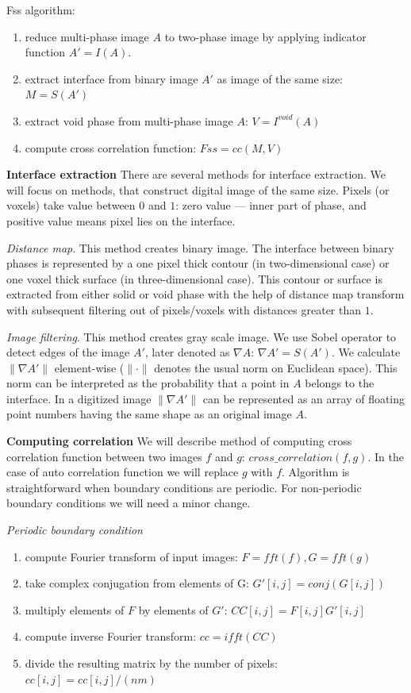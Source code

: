 \documentclass[reprint,amsmath,amssymb,aps,pre]{revtex4-1}
\begin{document}
Fss algorithm:
\begin{enumerate}
    \item reduce multi-phase image $A$ to two-phase image by applying indicator function $A'= I(A)$.
    \item extract interface from binary image $A'$ as image of the same size: $M = S(A')$
    \item extract void phase from multi-phase image $A$: $V = I^{void}(A)$
    \item compute cross correlation function: $Fss = cc(M, V)$
\end{enumerate}

\textbf{Interface extraction}
There are several methods for interface extraction.
We will focus on methods, that construct digital image of the same size.
Pixels (or voxels) take value between $0$ and $1$:
zero value --- inner part of phase, and positive value means pixel lies on the interface.

\textit{Distance map}.
This method creates binary image. 
The interface between binary phases is represented by a one
pixel thick contour (in two-dimensional case) or one voxel thick surface (in
three-dimensional case). This contour or surface is extracted from either solid
or void phase with the help of distance map transform with subsequent filtering
out of pixels/voxels with distances greater than $1$.

\textit{Image filtering}.
This method creates gray scale image.
We use Sobel operator
to detect edges of the image $A'$, later denoted as $\nabla A$:
$\nabla A' = S(A')$. We calculate $\|\nabla A'\|$ element-wise ($\|\cdot\|$
denotes the usual norm on Euclidean space). This norm can be interpreted as the
probability that a point in $A$ belongs to the interface. In a digitized image
$\|\nabla A'\|$ can be represented as an array of floating point numbers having
the same shape as an original image $A$.

\textbf{Computing correlation}
We will describe method of computing cross correlation function between two images $f$ and $g$: $cross\_correlation(f, g)$. In the case of auto correlation function we will replace $g$ with $f$. Algorithm is straightforward when boundary conditions are periodic.
For non-periodic boundary conditions we will need a minor change.

\textit{Periodic boundary condition}
\begin{enumerate}
    \item compute Fourier transform of input images: $F = fft(f), G = fft(g)$
    \item take complex conjugation from elements of G: $G'[i, j] = conj(G[i, j])$
    \item multiply elements of $F$ by elements of $G'$: $CC[i, j] = F[i, j] G'[i, j]$
    \item compute inverse Fourier transform: $cc = ifft(CC)$
    \item divide the resulting matrix by the number of pixels: $cc[i, j] = cc[i, j] / (n m)$
\end{enumerate}
\end{document}
